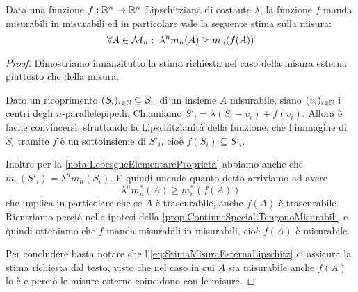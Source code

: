 \begin{proposition}\label{prop:LipschitzTengonoMisurabili}
	Data una funzione $f:\mathbb R^n\to\mathbb R^n$ Lipschitziana di costante $\lambda$, la funzione $f$ manda misurabili in misurabili ed in particolare vale la seguente stima sulla misura:
	\begin{equation*}
		\forall A\in\mathcal M_n:\ \lambda^n m_n(A) \ge m_n(f(A))
	\end{equation*}
\end{proposition}
\begin{proof}
	Dimostriamo innanzitutto la stima richiesta nel caso della misura esterna piuttosto che della misura.
	
	Dato un ricoprimento $(S_i)_{i\in\mathbb N}\subseteq \mathcal S_n$ di un insieme $A$ misurabile, siano $(v_i)_{i\in\mathbb N}$ i centri degli $n$-parallelepipedi.
	Chiamiamo $S'_i=\lambda(S_i-v_i)+f(v_i)$.
	Allora è facile convincersi, sfruttando la Lipschitzianità della funzione, che l'immagine di $S_i$ tramite $f$ è un sottoinsieme di $S'_i$, cioè $f(S_i)\subseteq S'_i$.
	
	Inoltre per la \cref{nota:LebesgueElementareProprieta} abbiamo anche che $m_n(S'_i)=\lambda^n m_n(S_i)$. 
	E quindi unendo quanto detto arriviamo ad avere
	\begin{equation}\label{eq:StimaMisuraEsternaLipschitz}
		\lambda^n m_n^*(A) \ge m_n^*(f(A)) 
	\end{equation}
	che implica in particolare che se $A$ è trascurabile, anche $f(A)$ è trascurabile.
	Rientriamo perciò nelle ipotesi della \cref{prop:ContinueSpecialiTengonoMisurabili} e quindi otteniamo che $f$ manda misurabili in misurabili, cioè $f(A)$ è misurabile.
	
	Per concludere basta notare che l'\cref{eq:StimaMisuraEsternaLipschitz} ci assicura la stima richiesta dal testo, visto che nel caso in cui $A$ sia misurabile anche $f(A)$ lo è e perciò le misure esterne coincidono con le misure.
\end{proof}

